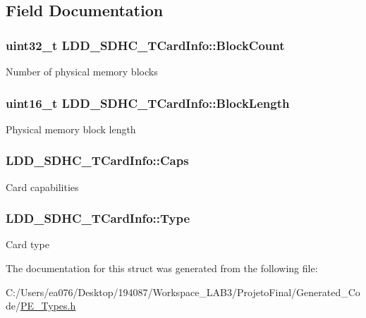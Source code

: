 \subsection{Field Documentation}
\hypertarget{struct_l_d_d___s_d_h_c___t_card_info_aaf0587f4fc0e52a160d0ac2a1106c4e9}{
\subsubsection[{Block\-Count}]{\setlength{\rightskip}{0pt plus 5cm}uint32\-\_\-t L\-D\-D\-\_\-\-S\-D\-H\-C\-\_\-\-T\-Card\-Info\-::\-Block\-Count}}\label{struct_l_d_d___s_d_h_c___t_card_info_aaf0587f4fc0e52a160d0ac2a1106c4e9}
Number of physical memory blocks \hypertarget{struct_l_d_d___s_d_h_c___t_card_info_a46cbdea4ece83eeaa17410e9763cc3a9}{
\subsubsection[{Block\-Length}]{\setlength{\rightskip}{0pt plus 5cm}uint16\-\_\-t L\-D\-D\-\_\-\-S\-D\-H\-C\-\_\-\-T\-Card\-Info\-::\-Block\-Length}}\label{struct_l_d_d___s_d_h_c___t_card_info_a46cbdea4ece83eeaa17410e9763cc3a9}
Physical memory block length \hypertarget{struct_l_d_d___s_d_h_c___t_card_info_a591c22d1aa49944325b35c63d2bf8199}{
\subsubsection[{Caps}]{ L\-D\-D\-\_\-\-S\-D\-H\-C\-\_\-\-T\-Card\-Info\-::\-Caps}}\label{struct_l_d_d___s_d_h_c___t_card_info_a591c22d1aa49944325b35c63d2bf8199}
Card capabilities \hypertarget{struct_l_d_d___s_d_h_c___t_card_info_ab2b86f6fe821778459edd351d08eb4bd}{
\subsubsection[{Type}]{ L\-D\-D\-\_\-\-S\-D\-H\-C\-\_\-\-T\-Card\-Info\-::\-Type}}\label{struct_l_d_d___s_d_h_c___t_card_info_ab2b86f6fe821778459edd351d08eb4bd}
Card type 

The documentation for this struct was generated from the following file\-:\begin{DoxyCompactItemize}
\item 
C\-:/\-Users/ea076/\-Desktop/194087/\-Workspace\-\_\-\-L\-A\-B3/\-Projeto\-Final/\-Generated\-\_\-\-Code/\hyperlink{_p_e___types_8h}{P\-E\-\_\-\-Types.\-h}\end{DoxyCompactItemize}
